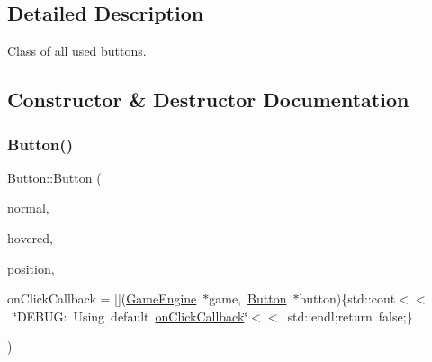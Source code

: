 \subsection{Detailed Description}
Class of all used buttons. 

\subsection{Constructor \& Destructor Documentation}
\mbox{\label{class_button_ad1a553528260f66367628724384cdfd0}} 
\subsubsection{\texorpdfstring{Button()}{Button()}\hspace{0.1cm}{\footnotesize\ttfamily [1/2]}}
{\footnotesize\ttfamily Button\+::\+Button (\begin{DoxyParamCaption}\item[{sf\+::\+Texture $\ast$}]{normal,  }\item[{sf\+::\+Texture $\ast$}]{hovered,  }\item[{const sf\+::\+Vector2f \&}]{position,  }\item[{bool($\ast$)(\mbox{\hyperlink{class_game_engine}{Game\+Engine}} $\ast$game, \mbox{\hyperlink{class_button}{Button}} $\ast$button)}]{on\+Click\+Callback = {\ttfamily \mbox{[}\mbox{]}(\mbox{\hyperlink{class_game_engine}{Game\+Engine}}~$\ast$game,~\mbox{\hyperlink{class_button}{Button}}~$\ast$button)\{std\+:\+:cout$<$$<$~\char`\"{}DEBUG\+:~Using~default~\mbox{\hyperlink{class_button_abd70dfccd5cce2eb6d4cae1d684107c3}{on\+Click\+Callback}}\char`\"{}$<$$<$~std\+:\+:endl;return~false;\}} }\end{DoxyParamCaption})}

\mbox{\label{class_button_ad1756d01fbebe40e07b45fd1963c33d8}} 
